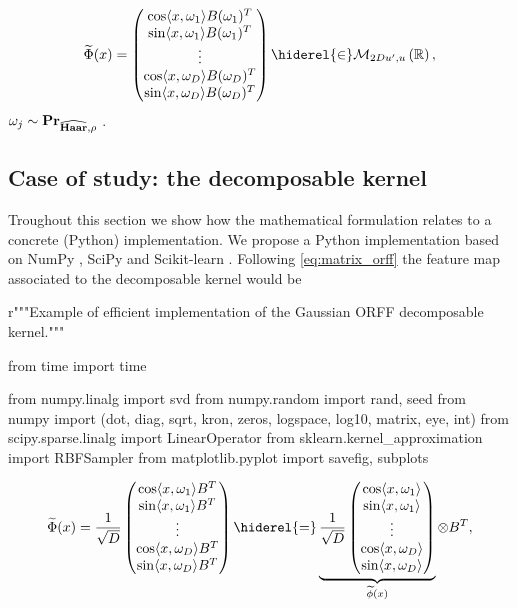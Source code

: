 \begin{dmath}
\label{eq:matrix_orff}
\tildePhi{\omega}(x) = \begin{pmatrix} \cos\inner{x,\omega_1}B(\omega_1)^T \\
\sin\inner{x,\omega_1}B(\omega_1)^T \\
\vdots \\
\cos\inner{x,\omega_D}B(\omega_D)^T \\
\sin\inner{x,\omega_D}B(\omega_D)^T
\end{pmatrix}\hiderel{\in}\mathcal{M}_{2Du',u}\left(\mathbb{R}\right),
\end{dmath}
$\omega_j\sim{\mathbf{{Pr}}}_{\widehat{\mathbf{Haar}}, \rho}$ \iid.
\subsection{Case of study: the decomposable kernel}
Troughout this section we show how the mathematical formulation relates to a concrete (Python) implementation. We propose a Python implementation based on NumPy \citep{oliphant2006guide}, SciPy \citep{jones2014scipy} and Scikit-learn \cite{pedregosa2011scikit}. Following \cref{eq:matrix_orff} the feature map associated to the decomposable kernel would be
\begin{pycode}
r"""Example of efficient implementation of the Gaussian ORFF decomposable kernel."""

from time import time

from numpy.linalg import svd
from numpy.random import rand, seed
from numpy import (dot, diag, sqrt, kron, zeros,
                   logspace, log10, matrix, eye, int)
from scipy.sparse.linalg import LinearOperator
from sklearn.kernel_approximation import RBFSampler
from matplotlib.pyplot import savefig, subplots
\end{pycode}
\begin{dmath*}
\label{eq:matrix_decomposable_orff}
\tildePhi{\omega}(x) = \frac{1}{\sqrt{D}}\begin{pmatrix} \cos\inner{x,\omega_1}B^T \\
\sin\inner{x,\omega_1}B^T \\
\vdots \\
\cos\inner{x,\omega_D}B^T \\
\sin\inner{x,\omega_D}B^T
\end{pmatrix}
\hiderel{=}
\underbrace{\frac{1}{\sqrt{D}}\begin{pmatrix} \cos\inner{x,\omega_1} \\
\sin\inner{x,\omega_1} \\
\vdots \\
\cos\inner{x,\omega_D} \\
\sin\inner{x,\omega_D}
\end{pmatrix}}_{\tildephi{\omega}(x)}\otimes B^T,
\end{dmath*}
